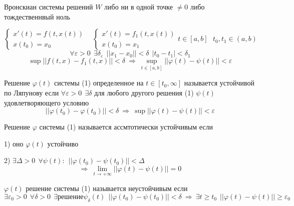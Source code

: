 \begin{block}[Следствие]
  Вронскиан системы решений $W$ либо ни в одной точке $\not= 0$ либо
  тождественнвый ноль
\end{block}

\begin{define}
  $$
  \left\{
  \begin{array}{l}
    x'(t) = f(t, x(t)) \\
    x(t_0) = x_0
  \end{array}
  \right.
  ~~~~
  \left\{
  \begin{array}{l}
    x'(t) = f_1(t, x(t)) \\
    x(t_0) = x_1
  \end{array}
  \right.
  t \in [a,b] ~~~ t_0, t_1 \in (a,b)
  $$
  $$
  \forall \varepsilon > 0 ~~ \exists \delta_{\varepsilon} ~~ ||x_1 - x_0||
  < \delta ~~ |t_0 - t_1| < \delta_1
  $$
  $$
  \sup ||f(t,x) - f_1(t,x)|| < \delta
  ~ \Rightarrow ~ \sup_{t \in [a,b]} ||\varphi(t) - \psi(t)|| < \varepsilon
  $$
\end{define}

\begin{define}
  Решение $\varphi(t)$ системы (1) определенное на $t \in [t_0, \infty]$
  называется устойчивой по Ляпунову если $\forall \varepsilon > 0 ~~ \exists
  \delta$ для любого другого решения (1) $\psi(t)$ удовлетворяющего условию
  $$
  ||\varphi(t_0) - \varphi(t_0)|| < \delta ~ \Rightarrow ~ \sup||\varphi(t) -
  \psi(t)|| < \varepsilon
  $$
\end{define}

\begin{define}
  Решение $\varphi$ системы (1) называется ассмтотически устойчивым если

  1) оно $\varphi(t)$ устойчиво

  2) $\exists \Delta > 0 ~~ \forall \psi(t): ~~ || \varphi(t_0) - \psi(t_0)||
  < \Delta$
  $$
  \Rightarrow ~ \lim_{t \to +\infty} ||\varphi(t) - \psi(t)|| = 0
  $$
\end{define}


\begin{define}
  $\varphi(t)$ решение системы (1) называется неустойчивым если
  $$
  \exists \varepsilon_0 > 0 ~~ \forall \delta > 0 ~~ \exists \text{решение}
  \psi_{\delta}(t) ~~ ||\varphi(t_0) - \psi(t_0)|| < \delta ~ \Rightarrow ~
  \exists t \ge t_0 ~~ || \varphi(t) - \psi(t)|| \ge \varepsilon_0
  $$
\end{define}

